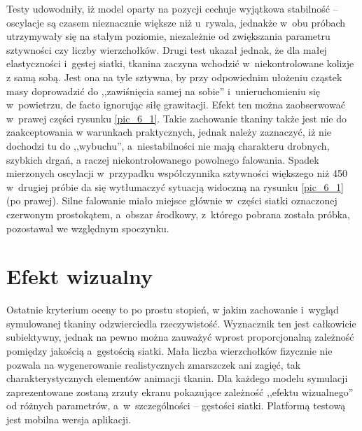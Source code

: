 		Testy udowodniły, iż model oparty na pozycji cechuje wyjątkowa stabilność -- oscylacje są czasem nieznacznie większe niż u~rywala, jednakże w~obu próbach utrzymywały się na stałym poziomie, niezależnie od zwiększania parametru sztywności czy liczby wierzchołków. Drugi test ukazał jednak, że dla małej elastyczności i~gęstej siatki, tkanina zaczyna wchodzić w~niekontrolowane kolizje z samą sobą. Jest ona na tyle sztywna, by przy odpowiednim ułożeniu cząstek masy doprowadzić do ,,zawiśnięcia samej na sobie'' i~unieruchomieniu się w~powietrzu, de facto ignorując siłę grawitacji. Efekt ten można zaobserwować w~prawej części rysunku \ref{pic_6_1}. Takie zachowanie tkaniny także jest nie do zaakceptowania w warunkach praktycznych, jednak należy zaznaczyć, iż nie dochodzi tu do ,,wybuchu'', a~niestabilności nie mają charakteru drobnych, szybkich drgań, a raczej niekontrolowanego powolnego falowania. Spadek mierzonych oscylacji w~przypadku współczynnika sztywności większego niż 450 w~drugiej próbie da się wytłumaczyć sytuacją widoczną na rysunku \ref{pic_6_1} (po prawej). Silne falowanie miało miejsce głównie w~części siatki oznaczonej czerwonym prostokątem, a~obszar środkowy, z~którego pobrana została próbka, pozostawał we względnym spoczynku.
		\newpage
		
		
		
		
	\section{Efekt wizualny}
	\label{t:wyniki:efektwiz}
		
		Ostatnie kryterium oceny to po prostu stopień, w jakim zachowanie i~wygląd symulowanej tkaniny odzwierciedla rzeczywistość. Wyznacznik ten jest całkowicie subiektywny, jednak na pewno można zauważyć wprost proporcjonalną zależność pomiędzy jakością a~gęstością siatki. Mała liczba wierzchołków fizycznie nie pozwala na wygenerowanie realistycznych zmarszczek ani zagięć, tak charakterystycznych elementów animacji tkanin. Dla każdego modelu symulacji zaprezentowane zostaną zrzuty ekranu pokazujące zależność ,,efektu wizualnego'' od różnych parametrów, a~w~szczególności -- gęstości siatki. Platformą testową jest mobilna wersja aplikacji.
		
